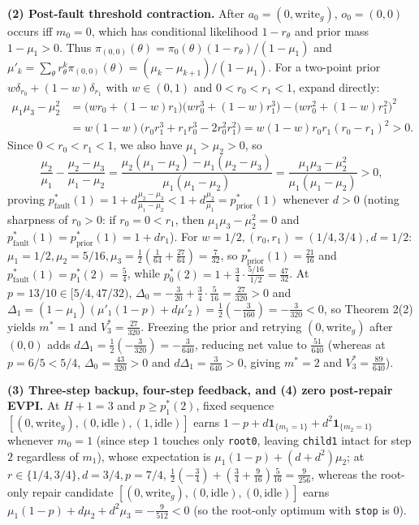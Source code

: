 \documentclass[11pt,letterpaper]{article}
\begin{document}
\textbf{(2) Post-fault threshold contraction.} After
\(a_0 = (0, \mathrm{write}_g)\), \(o_0 = (0,0)\) occurs iff \(m_0 = 0\),
which has conditional likelihood \(1 - r_\theta\) and prior mass
\(1 - \mu_1 > 0\). Thus
\(\pi_{(0,0)}(\theta) = \pi_0(\theta)(1 - r_\theta)/(1 - \mu_1)\) and
\(\mu'_k = \sum_\theta r_\theta^k \pi_{(0,0)}(\theta) = (\mu_k - \mu_{k+1})/(1 - \mu_1)\).
For a two-point prior \(w \delta_{r_0} + (1-w)\delta_{r_1}\) with
\(w \in (0,1)\) and \(0 < r_0 < r_1 < 1\), expand directly:
\[\begin{aligned}
\mu_1 \mu_3 - \mu_2^2
&= \bigl(w r_0 + (1-w)r_1\bigr)\bigl(w r_0^3 + (1-w)r_1^3\bigr) - \bigl(w r_0^2 + (1-w)r_1^2\bigr)^2 \\
&= w(1-w)\bigl(r_0 r_1^3 + r_1 r_0^3 - 2 r_0^2 r_1^2\bigr)
= w(1-w) r_0 r_1 (r_0 - r_1)^2 > 0.
\end{aligned}\] Since \(0 < r_0 < r_1 < 1\), we also have
\(\mu_1 > \mu_2 > 0\), so
\[\frac{\mu_2}{\mu_1} - \frac{\mu_2 - \mu_3}{\mu_1 - \mu_2}
= \frac{\mu_2(\mu_1 - \mu_2) - \mu_1(\mu_2 - \mu_3)}{\mu_1(\mu_1 - \mu_2)}
= \frac{\mu_1 \mu_3 - \mu_2^2}{\mu_1(\mu_1 - \mu_2)} > 0,\] proving
\(p_{\mathrm{fault}}^*(1) = 1 + d\frac{\mu_2 - \mu_3}{\mu_1 - \mu_2} < 1 + d\frac{\mu_2}{\mu_1} = p_{\mathrm{prior}}^*(1)\)
whenever \(d > 0\) (noting sharpness of \(r_0 > 0\): if
\(r_0 = 0 < r_1\), then \(\mu_1\mu_3 - \mu_2^2 = 0\) and
\(p_{\mathrm{fault}}^*(1) = p_{\mathrm{prior}}^*(1) = 1 + d r_1\)). For
\(w = 1/2, (r_0, r_1) = (1/4, 3/4), d = 1/2\):
\(\mu_1 = 1/2, \mu_2 = 5/16, \mu_3 = \frac{1}{2}(\frac{1}{64} + \frac{27}{64}) = \frac{7}{32}\),
so \(p_{\mathrm{prior}}^*(1) = \frac{21}{16}\) and
\(p_{\mathrm{fault}}^*(1) = p_1^*(2) = \frac{5}{4}\), while
\(p_0^*(2) = 1 + \frac{3}{4}\cdot\frac{5/16}{1/2} = \frac{47}{32}\). At
\(p = 13/10 \in [5/4, 47/32)\),
\(\Delta_0 = -\frac{3}{20} + \frac{3}{4}\cdot\frac{5}{16} = \frac{27}{320} > 0\)
and
\(\Delta_1 = (1 - \mu_1)(\mu'_1(1-p) + d\mu'_2) = \frac{1}{2}(-\frac{3}{160}) = -\frac{3}{320} < 0\),
so Theorem 2(2) yields \(m^* = 1\) and \(V_3^* = \frac{27}{320}\).
Freezing the prior and retrying \((0, \mathrm{write}_g)\) after
\((0,0)\) adds
\(d\Delta_1 = \frac{1}{2}(-\frac{3}{320}) = -\frac{3}{640}\), reducing
net value to \(\frac{51}{640}\) (whereas at \(p = 6/5 < 5/4\),
\(\Delta_0 = \frac{43}{320} > 0\) and \(d\Delta_1 = \frac{3}{640} > 0\),
giving \(m^* = 2\) and \(V_3^* = \frac{89}{640}\)).

\textbf{(3) Three-step backup, four-step feedback, and (4) zero
post-repair EVPI.} At \(H+1 = 3\) and \(p \ge p_1^*(2)\), fixed sequence
\([(0, \mathrm{write}_g), (0, \mathrm{idle}), (1, \mathrm{idle})]\)
earns \(1 - p + d\mathbf{1}_{\{m_1=1\}} + d^2\mathbf{1}_{\{m_2=1\}}\)
whenever \(m_0 = 1\) (since step \(1\) touches only \texttt{root0},
leaving \texttt{child1} intact for step \(2\) regardless of \(m_1\)),
whose expectation is \(\mu_1(1-p) + (d + d^2)\mu_2\); at
\(r \in \{1/4, 3/4\}, d = 3/4, p = 7/4\),
\(\frac{1}{2}(-\frac{3}{4}) + (\frac{3}{4} + \frac{9}{16})\frac{5}{16} = \frac{9}{256}\),
whereas the root-only repair candidate
\([(0,\mathrm{write}_g),(0,\mathrm{idle}),(0,\mathrm{idle})]\) earns
\(\mu_1(1-p) + d\mu_2 + d^2\mu_3 = -\frac{9}{512} < 0\) (so the
root-only optimum with \texttt{stop} is \(0\)).
\end{document}

